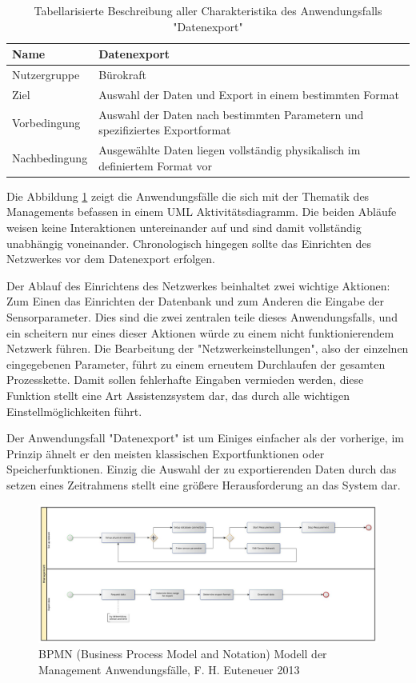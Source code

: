 \begin{table}[H]
\centering
\begin{tabular}{l | p{11cm}}
Name & Datenexport\\ \hline 
Nutzergruppe & Bürokraft\\ \hline 
Ziel & Auswahl der Daten und Export in einem bestimmten Format\\ \hline 
Vorbedingung & Auswahl der Daten nach bestimmten Parametern und spezifiziertes Exportformat\\ \hline 
Nachbedingung & Ausgewählte Daten liegen vollständig physikalisch im definiertem Format vor\\ 
\end{tabular}
\caption{Tabellarisierte Beschreibung aller Charakteristika des Anwendungsfalls "Datenexport"} 
\label{table:use case description of "Export data"}
\end{table}

Die Abbildung \ref{fig:bpmn_use-case_management} zeigt die Anwendungsfälle die sich mit der Thematik des Managements befassen in einem UML Aktivitätsdiagramm. Die beiden Abläufe weisen keine Interaktionen untereinander auf und sind damit vollständig unabhängig voneinander. Chronologisch hingegen sollte das Einrichten des Netzwerkes vor dem Datenexport erfolgen.

Der Ablauf des Einrichtens des Netzwerkes beinhaltet zwei wichtige Aktionen: Zum Einen das Einrichten der Datenbank und zum Anderen die Eingabe der Sensorparameter. Dies sind die zwei zentralen teile dieses Anwendungsfalls, und ein scheitern nur eines dieser Aktionen würde zu einem nicht funktionierendem Netzwerk führen. Die Bearbeitung der "Netzwerkeinstellungen", also der einzelnen eingegebenen Parameter, führt zu einem erneutem Durchlaufen der gesamten Prozesskette. Damit sollen fehlerhafte Eingaben vermieden werden, diese Funktion stellt eine Art Assistenzsystem dar, das durch alle wichtigen Einstellmöglichkeiten führt.

Der Anwendungsfall "Datenexport" ist um Einiges einfacher als der vorherige, im Prinzip ähnelt er den meisten klassischen Exportfunktionen oder Speicherfunktionen. Einzig die Auswahl der zu exportierenden Daten durch das setzen eines Zeitrahmens stellt eine größere Herausforderung an das System dar.

\begin{figure}[H]
	\centering
 	 \includegraphics[scale=0.24]{graphics/bpmn_use-cases_management.jpg} 
	\caption{BPMN (Business Process Model and Notation) Modell der Management Anwendungsfälle, F. H. Euteneuer 2013}
	 \label{fig:bpmn_use-case_management}
\end{figure}


